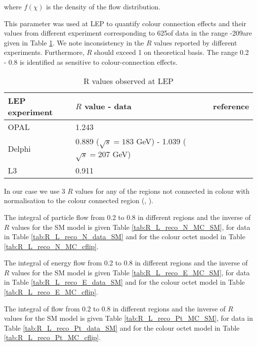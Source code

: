 where $f(\chi)$ is the density of the flow distribution.

This parameter was used at LEP to quantify colour connection effects and their values from different experiment corresponding to 625\pbinv of data in the range -209\GeV are given in Table \ref{tab:LEP_R}. We note inconsistency in the $R$ values reported by different experiments. Furthermore,  $R$ should exceed 1 on theoretical basis. The range 0.2 - 0.8 is identified as sensitive to colour-connection effects. 
\begin{table}
\centering
\begin{tabular}{lll}
LEP experiment & $R$ value - data                                        & reference\\
\hline
    OPAL       & 1.243                                                   & \cite{Abbiendi:2005es}\\
    Delphi     & 0.889 ($\sqrt{s}=183$ GeV) - 1.039 ($\sqrt{s}=207$ GeV) & \cite{Abdallah:2006uq}\\
    L3         & 0.911                                                   & \cite{Achard:2003pe}\\
  \end{tabular}
\caption{R values observed at LEP}
\label{tab:LEP_R}
\end{table} 

In our case we use 3 $R$ values for any of the regions not connected in colour with normalisation to the colour connected region (\leadingjet, \scndleadingjet).

The integral of particle flow from 0.2 to 0.8 in different regions and the inverse of $R$ values for the SM model is given Table \ref{tab:R_L_reco_N_MC_SM}, for data in Table \ref{tab:R_L_reco_N_data_SM} and for the \PW colour octet model in Table \ref{tab:R_L_reco_N_MC_cflip}.

The integral of energy flow from 0.2 to 0.8 in different regions and the inverse of $R$ values for the SM model is given Table \ref{tab:R_L_reco_E_MC_SM}, for data in Table \ref{tab:R_L_reco_E_data_SM} and for the \PW colour octet model in Table \ref{tab:R_L_reco_E_MC_cflip}.

The integral of \pt flow from 0.2 to 0.8 in different regions and the inverse of $R$ values for the SM model is given Table \ref{tab:R_L_reco_Pt_MC_SM}, for data in Table \ref{tab:R_L_reco_Pt_data_SM} and for the \PW colour octet model in Table \ref{tab:R_L_reco_Pt_MC_cflip}.




